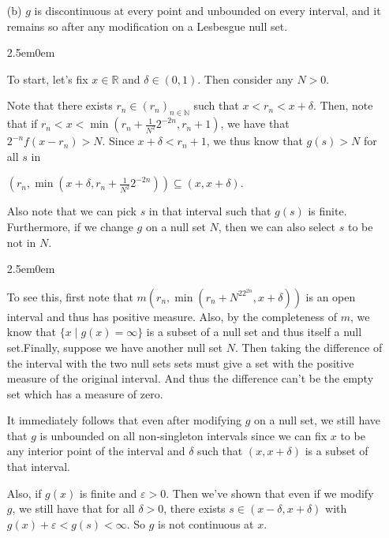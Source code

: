 \documentclass{book}
\newcommand{\exTwoP}{%
   \color{RedViolet}%
   \fontsize{13}{15}\selectfont%
}
\newcommand{\exPPP}{%
   \color{VioletRed}%
   \fontsize{12}{14}\selectfont%
}
\newenvironment{myIndent}{%
   \begin{adjustwidth}{2.5em}{0em}%
}{%
   \end{adjustwidth}%
}
\newcommand{\retTwo}{\hfill\bigbreak}
\begin{document}
\begin{enumerate}
\begin{myIndent}
      {\centering $g(x) = \sum\limits_{n = 1}^\infty 2^{-n} f(x - r_n) < \infty$ almost everywhere.\retTwo\par}
   \end{myIndent}

   \item[(b)] $g$ is discontinuous at every point and unbounded on every interval, and it remains so after any modification on a Lesbesgue null set.
   
   \begin{myIndent}\exTwoP
      To start, let's fix $x \in \mathbb{R}$ and $\delta \in (0, 1)$. Then consider any $N > 0$.\retTwo

      Note that there exists $r_n \in (r_n)_{n \in \mathbb{N}}$ such that $x < r_n < x + \delta$. Then, note that if $r_n < x < \min(r_n + \frac{1}{N^2}2^{-2n} ,r_n + 1)$, we have that $2^{-n}f(x - r_n) > N$. Since $x + \delta < r_n + 1$, we thus know that $g(s) > N$ for all $s$ in
      
      {\centering $(r_n, \min(x + \delta, r_n + \frac{1}{N^2}2^{-2n})) \subseteq (x, x + \delta)$.\retTwo\par}

      Also note that we can pick $s$ in that interval such that $g(s)$ is finite. Furthermore, if we change $g$ on a null set $N$, then we can also select $s$ to be not in $N$.
      \begin{myIndent}\exPPP
         To see this, first note that $m(r_n, \min(r_n + N^22^{2n}, x + \delta))$ is an open interval and thus has positive measure. Also, by the completeness of $m$, we know that $\{x \mid g(x) = \infty\}$ is a subset of a null set and thus itself a null set.\newpage Finally, suppose we have another null set $N$. Then taking the difference of the interval with the two null sets sets must give a set with the positive measure of the original interval. And thus the difference can't be the empty set which has a measure of zero.\retTwo
      \end{myIndent}

      It immediately follows that even after modifying $g$ on a null set, we still have that $g$ is unbounded on all non-singleton intervals since we can fix $x$ to be any interior point of the interval and $\delta$ such that $(x, x + \delta)$ is a subset of that interval.\retTwo

      Also, if $g(x)$ is finite and $\varepsilon > 0$. Then we've shown that even if we modify\\ $g$, we still have that for all $\delta > 0$, there exists $s \in (x - \delta, x + \delta)$ with\\ $g(x) + \varepsilon < g(s) < \infty$. So $g$ is not continuous at $x$.\retTwo


\end{myIndent}
\end{enumerate}
\end{document}
